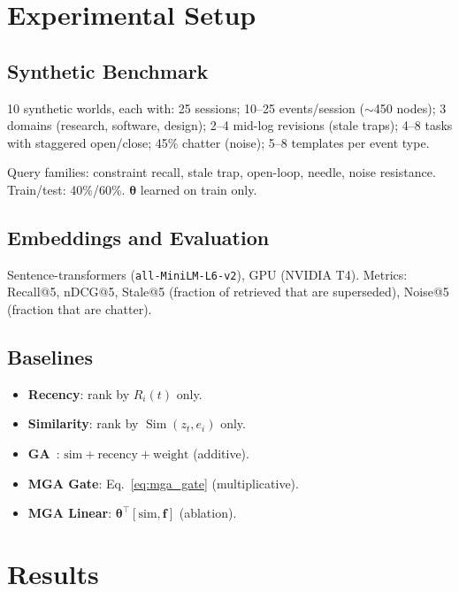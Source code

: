 \documentclass{article}
\newcommand{\simfn}{\operatorname{Sim}}
\begin{document}
\section{Experimental Setup}

\subsection{Synthetic Benchmark}

10 synthetic worlds, each with: 25 sessions; 10--25 events/session ($\sim$450 nodes); 3 domains (research, software, design); 2--4 mid-log revisions (stale traps); 4--8 tasks with staggered open/close; 45\% chatter (noise); 5--8 templates per event type.

Query families: constraint recall, stale trap, open-loop, needle, noise resistance. Train/test: 40\%/60\%. $\boldsymbol{\theta}$ learned on train only.

\subsection{Embeddings and Evaluation}

Sentence-transformers (\texttt{all-MiniLM-L6-v2}), GPU (NVIDIA T4). Metrics: Recall@5, nDCG@5, Stale@5 (fraction of retrieved that are superseded), Noise@5 (fraction that are chatter).

\subsection{Baselines}

\begin{itemize}[leftmargin=2em,itemsep=2pt]
\item \textbf{Recency}: rank by $R_i(t)$ only.
\item \textbf{Similarity}: rank by $\simfn(z_t, e_i)$ only.
\item \textbf{GA}~\citep{park2023generative}: $\text{sim} + \text{recency} + \text{weight}$ (additive).
\item \textbf{MGA Gate}: Eq.~\ref{eq:mga_gate} (multiplicative).
\item \textbf{MGA Linear}: $\boldsymbol{\theta}^\top [\text{sim}, \mathbf{f}]$ (ablation).
\end{itemize}

\section{Results}
\end{document}
